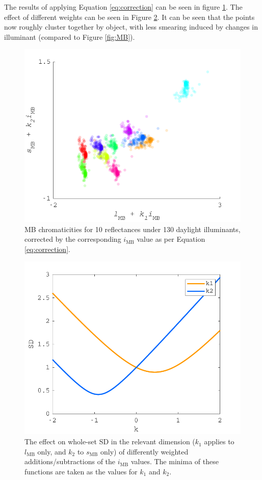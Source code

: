 The results of applying Equation \ref{eq:correction} can be seen in figure \ref{fig:corrected}. The effect of different weights can be seen in Figure \ref{fig:minSD}. It can be seen that the points now roughly cluster together by object, with less smearing induced by changes in illuminant (compared to Figure \ref{fig:MB}).

\begin{figure}[htbp]
    \includegraphics[max width=\textwidth]{figs/comp/transformToIllIndSpace/correctedChromaticities.pdf}
    \caption{\gls{MB} chromaticities for 10 reflectances under 130 daylight illuminants, corrected by the corresponding $i_{\text{MB}}$ value as per Equation \ref{eq:correction}.}
    \label{fig:corrected}
\end{figure} 

\begin{figure}[htbp]
    \includegraphics[max width=\textwidth]{figs/comp/transformToIllIndSpace/kvsSD.pdf}
    \caption{The effect on whole-set SD in the relevant dimension ($k_{1}$ applies to $l_{\text{MB}}$ only, and $k_{2}$ to $s_{\text{MB}}$ only) of differently weighted additions/subtractions of the $i_{\text{MB}}$ values. The minima of these functions are taken as the values for $k_{1}$ and $k_{2}$.}
    \label{fig:minSD}
\end{figure} 

